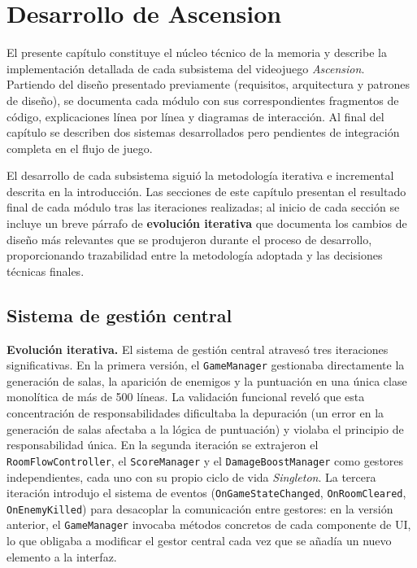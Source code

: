 ﻿\chapter{Desarrollo de Ascension}


El presente capítulo constituye el núcleo técnico de la memoria y describe la implementación detallada de cada subsistema del videojuego \textit{Ascension}. Partiendo del diseño presentado previamente (requisitos, arquitectura y patrones de diseño), se documenta cada módulo con sus correspondientes fragmentos de código, explicaciones línea por línea y diagramas de interacción. Al final del capítulo se describen dos sistemas desarrollados pero pendientes de integración completa en el flujo de juego.

El desarrollo de cada subsistema siguió la metodología iterativa e incremental descrita en la introducción. Las secciones de este capítulo presentan el resultado final de cada módulo tras las iteraciones realizadas; al inicio de cada sección se incluye un breve párrafo de \textbf{evolución iterativa} que documenta los cambios de diseño más relevantes que se produjeron durante el proceso de desarrollo, proporcionando trazabilidad entre la metodología adoptada y las decisiones técnicas finales.

\section{Sistema de gestión central}


\textbf{Evolución iterativa.} El sistema de gestión central atravesó tres iteraciones significativas. En la primera versión, el \texttt{GameManager} gestionaba directamente la generación de salas, la aparición de enemigos y la puntuación en una única clase monolítica de más de 500 líneas. La validación funcional reveló que esta concentración de responsabilidades dificultaba la depuración (un error en la generación de salas afectaba a la lógica de puntuación) y violaba el principio de responsabilidad única. En la segunda iteración se extrajeron el \texttt{RoomFlowController}, el \texttt{ScoreManager} y el \texttt{DamageBoostManager} como gestores independientes, cada uno con su propio ciclo de vida \textit{Singleton}. La tercera iteración introdujo el sistema de eventos (\texttt{OnGameStateChanged}, \texttt{OnRoomCleared}, \texttt{OnEnemyKilled}) para desacoplar la comunicación entre gestores: en la versión anterior, el \texttt{GameManager} invocaba métodos concretos de cada componente de UI, lo que obligaba a modificar el gestor central cada vez que se añadía un nuevo elemento a la interfaz.

